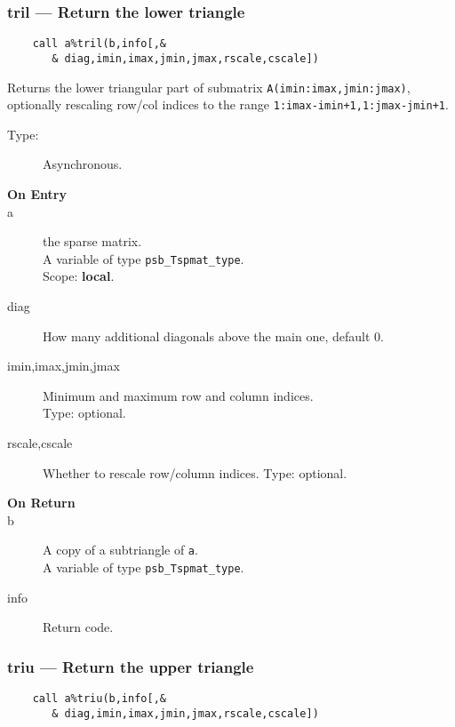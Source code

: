 \subsubsection*{tril --- Return the lower triangle}
\begin{verbatim}
    call a%tril(b,info[,&
       & diag,imin,imax,jmin,jmax,rscale,cscale])
\end{verbatim}

Returns the lower triangular part of submatrix
\verb|A(imin:imax,jmin:jmax)|, optionally rescaling row/col indices to
the range \verb|1:imax-imin+1,1:jmax-jmin+1|.   
\begin{description}
\item[Type:] Asynchronous.
\item[\bf On Entry]
\item[a] the sparse matrix.\\
A variable of type \verb|psb_Tspmat_type|.\\
Scope: {\bf local}.\\
\item[diag] How many additional diagonals above the main one, default 0.
\item[imin,imax,jmin,jmax] Minimum and maximum row and column indices.\\
Type: optional.
\item[rscale,cscale] Whether to rescale row/column indices.
Type: optional.
\end{description}
\begin{description}
\item[\bf On Return]
\item[b] A copy  of a subtriangle of \verb|a|.\\
A variable of type \verb|psb_Tspmat_type|.
\item[info] Return code. 
\end{description}

\subsubsection*{triu --- Return the upper triangle}
\begin{verbatim}
    call a%triu(b,info[,&
       & diag,imin,imax,jmin,jmax,rscale,cscale])
\end{verbatim}

